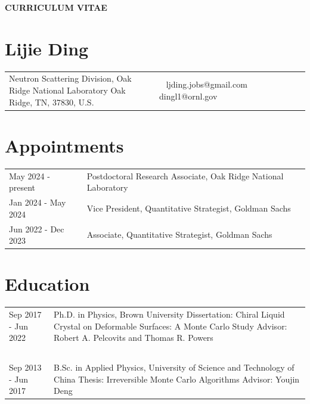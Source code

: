 \documentclass[11pt,letterpaper]{article}
\begin{document}
\pagestyle{headings}
\begin{center}
    \Large{\textbf{CURRICULUM VITAE}}
\end{center}
\section*{Lijie Ding}
\vspace*{-0.15in}
\begin{longtable}{p{0.5\linewidth} p{0.5\linewidth}}
    Neutron Scattering Division, \newline
    Oak Ridge National Laboratory \newline
    Oak Ridge, TN, 37830, U.S.
     & ~\newline
    ljding.jobs@gmail.com \newline
    dingl1@ornl.gov
\end{longtable}


\section*{Appointments}
\vspace*{-0.15in}
\begin{longtable}{l p{\linewidth}}
    May 2024 - present  & Postdoctoral Research Associate, Oak Ridge National Laboratory \\
    Jan 2024 - May 2024 & Vice President, Quantitative Strategist, Goldman Sachs \\
    Jun 2022 - Dec 2023 & Associate, Quantitative Strategist, Goldman Sachs \\
\end{longtable}


\section*{Education}
\vspace*{-0.15in}
\begin{longtable}{l p{\linewidth}}
    Sep 2017 - Jun 2022   & Ph.D. in Physics, Brown University \newline
    Dissertation: Chiral Liquid Crystal on Deformable Surfaces: A Monte Carlo Study \newline
    Advisor: Robert A. Pelcovits and Thomas R. Powers                                                 \\~\\
    Sep 2013 - Jun 2017   & B.Sc. in Applied Physics, University of Science and Technology of China \newline
    Thesis: Irreversible Monte Carlo Algorithms \newline
    Advisor: Youjin Deng
\end{longtable}
\end{document}
